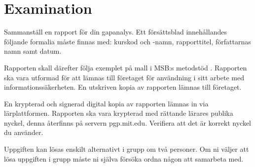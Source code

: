 \documentclass[a4paper]{llncs}
\begin{document}
\section{Examination}

Sammanställ en rapport för din gapanalys.
Ett försättsblad innehållandes följande formalia måste finnas med:
kurskod och -namn, rapporttitel, författarnas namn samt datum.

Rapporten skall därefter följa exemplet på mall i MSB:s metodstöd \citep[bilaga 
C]{MSB2011gap}.
Rapporten ska vara utformad för att lämnas till företaget för användning i sitt
arbete med informationssäkerheten.
En utskriven kopia av rapporten lämnas till företaget.

En krypterad och signerad digital kopia av rapporten lämnas in via 
lärplattformen.
Rapporten ska vara krypterad med rättande lärares publika nyckel, denna 
återfinns på servern pgp.mit.edu.
Verifiera att det är korrekt nyckel du använder.


Uppgiften kan lösas enskilt alternativt i grupp om två personer.
Om ni väljer att lösa uppgiften i grupp måste ni själva försöka ordna någon
att samarbeta med.


\printbibliography{}
\end{document}
